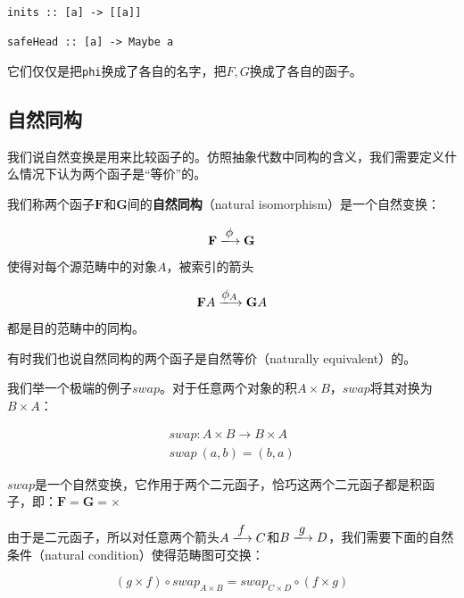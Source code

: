 \documentclass{article}
\begin{document}
\begin{lstlisting}
inits :: [a] -> [[a]]

safeHead :: [a] -> Maybe a
\end{lstlisting}

它们仅仅是把\texttt{phi}换成了各自的名字，把$F, G$换成了各自的函子。

\subsection{自然同构}

我们说自然变换是用来比较函子的。仿照抽象代数中同构的含义，我们需要定义什么情况下认为两个函子是“等价”的。

\begin{definition}
我们称两个函子$\mathbf{F}$和$\mathbf{G}$间的\textbf{自然同构}（natural isomorphism）是一个自然变换：

\[
  \mathbf{F} \arrowto{\phi} \mathbf{G}
\]

使得对每个源范畴中的对象$A$，被索引的箭头

\[
  \mathbf{F}A \arrowto{\phi_A} \mathbf{G}A
\]

都是目的范畴中的同构。
\end{definition}

有时我们也说自然同构的两个函子是自然等价（naturally equivalent）的。

我们举一个极端的例子$swap$。对于任意两个对象的积$A \times B$，$swap$将其对换为$B \times A$：

\[
\begin{array}{l}
swap : A \times B \to B \times A \\
swap\ (a, b) = (b, a)
\end{array}
\]

$swap$是一个自然变换，它作用于两个二元函子，恰巧这两个二元函子都是积函子，即：$\mathbf{F} = \mathbf{G} = \times$

由于是二元函子，所以对任意两个箭头$A \arrowto{f} C$和$B \arrowto{g} D$，我们需要下面的自然条件（natural condition）使得范畴图可交换：

\[
(g \times f) \circ swap_{A \times B} = swap_{C \times D} \circ (f \times g)
\]

\begin{center}
\end{center}
\end{document}
